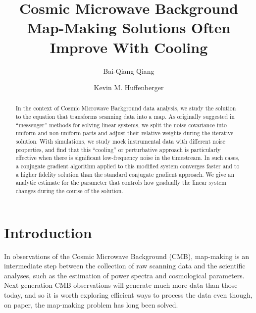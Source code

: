 \documentclass[twocolumn,linenumbers]{aastex631}
\begin{document}
\title{Cosmic Microwave Background Map-Making Solutions Often Improve With Cooling}


  \author{Bai-Qiang Qiang} 

\author[0000-0001-7109-0099]{Kevin M. Huffenberger}

 
\begin{abstract}

In the context of Cosmic Microwave Background data analysis, we study the solution to the equation that transforms scanning data into a map.
As originally suggested in ``messenger'' methods for solving linear systems, we split the  noise covariance into uniform and non-uniform parts and adjust their relative weights during the iterative solution.
With simulations, we study mock instrumental data with different noise properties, and find that this ``cooling'' or perturbative approach is particularly effective when there is significant low-frequency noise in the timestream.  In such cases, a conjugate gradient algorithm applied to this modified system converges faster and to a higher fidelity solution than the standard conjugate gradient approach. %
We give an analytic estimate for the parameter that controls how gradually the linear system changes during the course of the solution.

\end{abstract}


\section{Introduction} \label{sec:intro}


In observations of the Cosmic Microwave Background (CMB), map-making is an intermediate step between the collection of raw scanning data and the scientific analyses, such as the estimation of power spectra and cosmological parameters.
Next generation CMB observations will generate much more data than those today, and so
it is worth exploring efficient ways to process the data even though, on paper, the map-making problem has long been solved.
\end{document}

